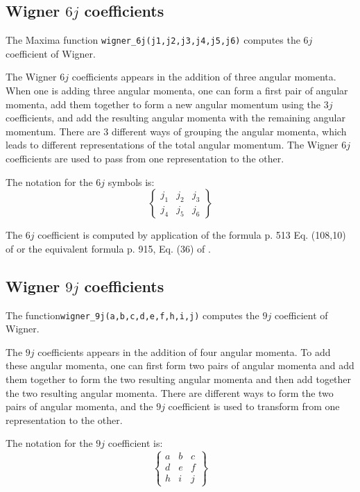 \documentclass[11pt]{article}
\begin{document}
\subsection{Wigner $6j$ coefficients}

The Maxima function \texttt{wigner\_6j(j1,j2,j3,j4,j5,j6)} computes the $6j$ 
coefficient of Wigner.

The Wigner $6j$ coefficients appears in the addition of three angular momenta. 
When one is adding three angular momenta, one can form a first 
pair of angular momenta, add them together to form a new angular momentum
using the $3j$ coefficients, and add the resulting angular momenta with the
remaining angular momentum\cite{landau_mecaq,messiah_field_chapter}.
There are 3 different ways of grouping the angular momenta, which leads to 
different representations of the total angular momentum. 
The Wigner $6j$ coefficients are used to pass from one representation to the 
other. 

The notation for the $6j$ symbols is:
\begin{equation}
  \left\{\begin{array}{ccc}j_1 & j_2 & j_3 \\ j_4 & j_5 & j_6\end{array} \right\} 
\end{equation}

The $6j$ coefficient is computed by application of the formula  p. 513 Eq. (108,10) of \cite{landau_mecaq} or the equivalent formula  p. 915, Eq. (36) of \cite{messiah_field_chapter}. 


\subsection{Wigner $9j$ coefficients}

The function\texttt{wigner\_9j(a,b,c,d,e,f,h,i,j)} computes 
the $9j$ coefficient of Wigner. 

The $9j$ coefficients appears in the addition of four angular momenta. 
To add these angular momenta, one can first form two pairs of angular 
momenta and add them together to form the two resulting angular momenta 
and then add together the two resulting angular momenta. 
There are different ways to form the two pairs of angular momenta, and 
the $9j$ coefficient is used to transform from one representation to
the other\cite{landau_mecaq,messiah_field_chapter}. 

The notation for the $9j$ coefficient is:
\begin{equation}
  \left\{\begin{array}{cccc} a & b & c \\ d & e & f \\ h & i & j \end{array} \right\} 
\end{equation}
\end{document}
